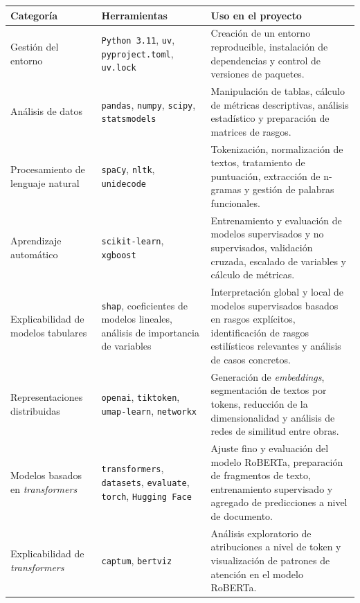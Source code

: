 \documentclass[IB]{TFUOC}%
\begin{document}
\begin{longtable}{|p{3.6cm}|>{\raggedright\arraybackslash}p{4.2cm}|p{7cm}|}
\hline
\textbf{Categoría} & \textbf{Herramientas} & \textbf{Uso en el proyecto} \\
\hline

Gestión del entorno &
\texttt{Python 3.11}, \texttt{uv}, \texttt{pyproject.toml}, \texttt{uv.lock} &
Creación de un entorno reproducible, instalación de dependencias y control de versiones de paquetes. \\
\hline

Análisis de datos &
\texttt{pandas}, \texttt{numpy}, \texttt{scipy}, \texttt{statsmodels} &
Manipulación de tablas, cálculo de métricas descriptivas, análisis estadístico y preparación de matrices de rasgos. \\
\hline

Procesamiento de lenguaje natural &
\texttt{spaCy}, \texttt{nltk}, \texttt{unidecode} &
Tokenización, normalización de textos, tratamiento de puntuación, extracción de n-gramas y gestión de palabras funcionales. \\
\hline

Aprendizaje automático &
\texttt{scikit-learn}, \texttt{xgboost} &
Entrenamiento y evaluación de modelos supervisados y no supervisados, validación cruzada, escalado de variables y cálculo de métricas. \\
\hline

Explicabilidad de modelos tabulares &
\texttt{shap}, coeficientes de modelos lineales, análisis de importancia de variables &
Interpretación global y local de modelos supervisados basados en rasgos explícitos, identificación de rasgos estilísticos relevantes y análisis de casos concretos. \\
\hline

Representaciones distribuidas &
\texttt{openai}, \texttt{tiktoken}, \texttt{umap-learn}, \texttt{networkx} &
Generación de \textit{embeddings}, segmentación de textos por tokens, reducción de la dimensionalidad y análisis de redes de similitud entre obras. \\
\hline

Modelos basados en \textit{transformers} &
\texttt{transformers}, \texttt{datasets}, \texttt{evaluate}, \texttt{torch}, \texttt{Hugging Face} &
Ajuste fino y evaluación del modelo RoBERTa, preparación de fragmentos de texto, entrenamiento supervisado y agregado de predicciones a nivel de documento. \\
\hline

Explicabilidad de \textit{transformers} &
\texttt{captum}, \texttt{bertviz} &
Análisis exploratorio de atribuciones a nivel de token y visualización de patrones de atención en el modelo RoBERTa. \\
\hline


\end{longtable}
\end{document}
